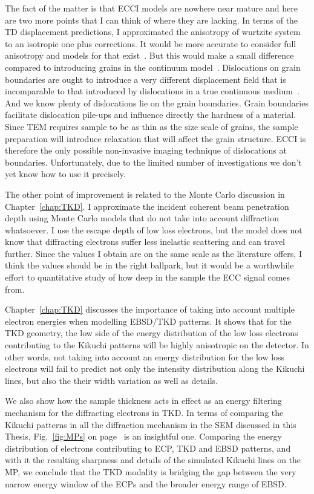 The fact of the matter is that ECCI models are nowhere near mature and here are two more points that I can think of where they are lacking. In terms of the TD displacement predictions, I approximated the anisotropy of wurtzite system to an isotropic one plus corrections. It would be more accurate to consider full anisotropy and models for that exist~\cite{Barnett71}. But this would make a small difference  compared to introducing grains in the continuum model~\cite{Read50}. Dislocations on grain boundaries are ought to introduce a very different displacement field that is incomparable to that introduced by dislocations in a true continuous medium~\cite{Van02}. And we know plenty of dislocations lie on the grain boundaries. Grain boundaries facilitate dislocation pile-ups and influence directly the hardness of a material. Since TEM requires sample to be as thin as the size scale of grains, the sample preparation will introduce relaxation that will affect the grain structure. ECCI is therefore the only possible non-invasive imaging technique of dislocations at boundaries. Unfortunately, due to the limited number of  investigations we don't yet know how to use it precisely.

The other point of improvement is related to the Monte Carlo discussion in Chapter~\ref{chap:TKD}. I approximate the incident coherent beam penetration depth using Monte Carlo models that do not take into account diffraction whatsoever. I use the escape depth of low loss electrons, but the model does not know that diffracting electrons suffer less inelastic scattering and can travel further. Since the values I obtain are on the same scale as the literature offers, I think the values should be in the right ballpark, but it would be a worthwhile effort to quantitative study of how deep in the sample the ECC signal comes from.

Chapter~\ref{chap:TKD} discusses the importance of taking into account multiple electron energies when modelling EBSD/TKD patterns. It shows that for the TKD geometry, the low side of the energy distribution of the low loss electrons contributing to the Kikuchi patterns will be highly anisotropic on the detector. In other words, not taking into account an energy distribution for the low loss electrons will fail to predict not only the intensity distribution along the Kikuchi lines, but also the their width variation as well as details.

We also show how the sample thickness acts in effect as an energy filtering mechanism for the diffracting electrons in TKD. In terms of comparing the Kikuchi patterns in all the diffraction mechanism in the SEM discussed in this Thesis, Fig.~\ref{fig:MPs} on page~\pageref{fig:MPs} is an insightful one. Comparing the energy distribution of electrons contributing to ECP, TKD and EBSD patterns, and with it the resulting sharpness and details of the simulated Kikuchi lines on the MP, we conclude that the TKD modality is bridging the gap between the very narrow energy window of the ECPs and the broader energy range of EBSD. 

%